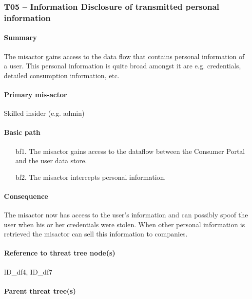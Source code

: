 \subsubsection{T05 -- Information Disclosure of transmitted personal
information}
\label{threats:t05}

\paragraph{Summary}

\npar The misactor gains access to the data flow that contains personal
information of a user. This personal information is quite broad amongst it are
e.g. credentials, detailed consumption information, etc.

\paragraph{Primary mis-actor}

\npar Skilled insider (e.g. admin)

\paragraph{Basic path}
\begin{enumerate}
	\item[bf1.] The misactor gains access to the dataflow between the Consumer
	Portal and the user data store.
    \item[bf2.] The misactor intercepts personal information.
\end{enumerate}

\paragraph{Consequence}

\npar The misactor now has access to the user's information and can possibly
spoof the user when his or her credentials were stolen. When other personal
information is retrieved the misactor can sell this information to companies.

\paragraph{Reference to threat tree node(s)}

ID\_df4, ID\_df7

\paragraph{Parent threat tree(s)}


